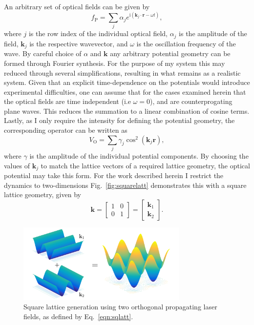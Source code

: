 An arbitrary set of optical fields can be given by
\begin{equation}\label{eqn:optfield}
    f_{\textrm{P}} = \displaystyle\sum\limits_{j} \alpha_j e^{\textrm{i}\left(\mathbf{k}_j\cdot\mathbf{r} - \omega t\right)},
\end{equation}
where $j$ is the row index of the individual optical field, $\alpha_j$ is the amplitude of the field, $\mathbf{k}_j$ is the respective wavevector, and $\omega$ is the oscillation frequency of the wave. By careful choice of $\alpha$ and $\mathbf{k}$ any arbitrary potential geometry can be formed through Fourier synthesis. For the purpose of my system this may reduced through several simplifications, resulting in what remains as a realistic system. Given that an explicit time-dependence on the potentials would introduce experimental difficulties, one can assume that for the cases examined herein that the optical fields are time independent (i.e $\omega=0$), and are counterprogating plane waves. This reduces the summation to a linear combination of cosine terms. Lastly, as I only require the intensity for defining the potential geometry, the corresponding operator can be written as
\begin{equation}\label{eqn:vopt}
    V_{\textrm{O}} = \displaystyle\sum\limits_{j} \gamma_j \cos^2 \left(\mathbf{k}_j \mathbf{r}\right),
\end{equation}
where $\gamma$ is the amplitude of the individual potential components. By choosing the values of $\mathbf{k}_j$ to match the lattice vectors of a required lattice geometry, the optical potential may take this form. For the work described herein I restrict the dynamics to two-dimensions Fig.~\ref{fig:squarelatt} demonstrates this with a square lattice geometry, given by
\begin{equation}\label{eqn:sqlatt}
    \mathbf{k} =
    \begin{bmatrix}
     1 & 0 \\
     0 & 1
    \end{bmatrix} =
    \begin{bmatrix}
     \mathbf{k}_1  \\
     \mathbf{k}_2
    \end{bmatrix}.
\end{equation}

\begin{figure}\centering
    \includegraphics[width=0.75\textwidth]{./Images/ch4_vtx/VOPT/squarelatt}
    \caption{Square lattice generation using two orthogonal propagating laser fields, as defined by Eq.~\ref{eqn:sqlatt}.}\label{fig:cos2xy}
\end{figure}

